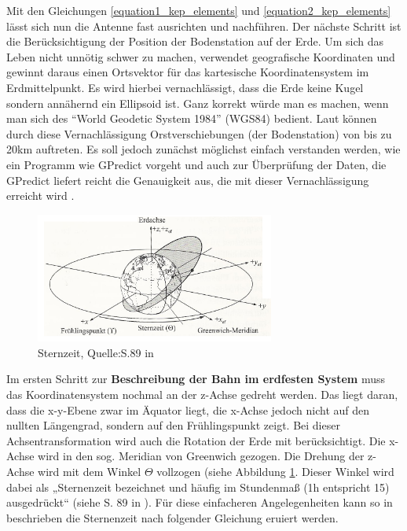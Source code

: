 Mit den Gleichungen \ref{equation1_kep_elements} und \ref{equation2_kep_elements} lässt sich nun die Antenne fast ausrichten und nachführen. Der nächste Schritt ist die Berücksichtigung der Position der Bodenstation auf der Erde. Um sich das Leben nicht unnötig schwer zu machen, verwendet geografische Koordinaten und gewinnt daraus einen Ortsvektor für das kartesische Koordinatensystem im Erdmittelpunkt. Es wird hierbei vernachlässigt, dass die Erde keine Kugel sondern annähernd ein Ellipsoid ist. Ganz korrekt würde man es machen, wenn man sich des "`World Geodetic System 1984"' (WGS84) bedient. Laut \cite{Wiki:Geo} können durch diese Vernachlässigung Orstverschiebungen (der Bodenstation) von bis zu 20km auftreten. Es soll jedoch zunächst möglichst einfach verstanden werden, wie ein Programm wie GPredict vorgeht und auch zur Überprüfung der Daten, die GPredict liefert reicht die Genauigkeit aus, die mit dieser Vernachlässigung erreicht wird .
\begin{figure}[h]                                                                           %
	\centering                                                                            	%
	\includegraphics[width=0.7\textwidth]{./images/startime.jpg}                    		%
	\caption[Sternzeit]{Sternzeit, Quelle:S.89 in \cite{HandRaum}}                          %
	\label{fig:startime}                                                                	%
\end{figure}                                                                              	%
Im ersten Schritt zur  \textbf{Beschreibung der Bahn im erdfesten System} muss das Koordinatensystem nochmal an der z-Achse gedreht werden. Das liegt daran, dass die x-y-Ebene zwar im Äquator liegt, die x-Achse jedoch nicht auf den nullten Längengrad, sondern auf den Frühlingspunkt zeigt. Bei dieser Achsentransformation wird auch die Rotation der Erde mit berücksichtigt. Die x-Achse wird in den sog. Meridian von Greenwich gezogen. Die Drehung der z-Achse wird mit dem Winkel \ensuremath{\Theta} vollzogen (siehe Abbildung \ref{fig:startime}. Dieser Winkel wird dabei als „Sternenzeit bezeichnet und häufig im Stundenmaß (1h entspricht 15\degree) ausgedrückt“ (siehe S. 89 in \cite{HandRaum}). Für diese einfacheren Angelegenheiten kann so in \cite{HandRaum} beschrieben die Sternenzeit nach folgender Gleichung eruiert werden.
